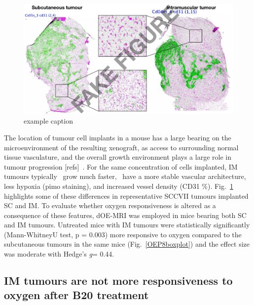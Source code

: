 \documentclass[num-refs]{wiley-article}
\begin{document}
\begin{figure}[htbp]
   \centering
   \includegraphics[width=\textwidth]{images/3_imsc_zoomed.png} %
   \caption{example caption}
   \label{imsc}
\end{figure}

The location of tumour cell implants in a mouse has a large bearing on the microenvironment of the resulting  xenograft, as access to surrounding normal tissue vasculature, and the overall growth environment plays a large role in tumour progression [refs]~. 
For the same concentration of cells implanted, IM tumours typically~ grow much faster,~ have a more stable vascular architecture, less hypoxia (pimo staining), and increased vessel density (CD31 \%).
Fig.~\ref{imsc} highlights some of these differences in representative SCCVII  tumours implanted SC and IM. 
To evaluate whether oxygen responsiveness is altered as a consequence of these features, dOE-MRI was employed in mice bearing both SC and IM tumours.
Untreated mice with IM tumours were statistically significantly (Mann-WhitneyU test, p = 0.003) more responsive to oxygen compared to the subcutaneous tumours in the same mice (Fig.~\ref{OEP8boxplot}) and the effect size was moderate with Hedge's \emph{g}= 0.44.

\subsection{IM tumours are not more responsiveness to oxygen after B20 treatment}
\end{document}
